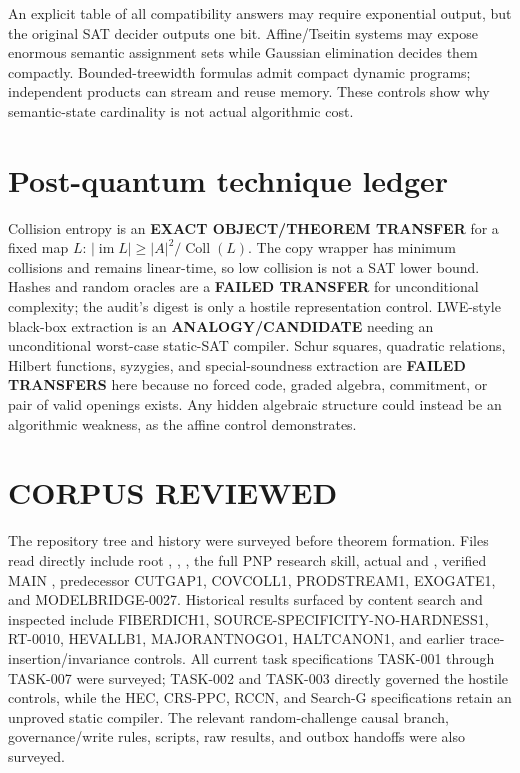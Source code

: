 \documentclass[11pt]{article}
\begin{document}
An explicit table of all compatibility answers may require exponential
output, but the original SAT decider outputs one bit.  Affine/Tseitin systems
may expose enormous semantic assignment sets while Gaussian elimination
decides them compactly.  Bounded-treewidth formulas admit compact dynamic
programs; independent products can stream and reuse memory.  These controls
show why semantic-state cardinality is not actual algorithmic cost.

\section{Post-quantum technique ledger}
Collision entropy is an \textbf{EXACT OBJECT/THEOREM TRANSFER} for a fixed
map $L$: $|\operatorname{im}L|\ge |A|^2/\operatorname{Coll}(L)$.  The copy
wrapper has minimum collisions and remains linear-time, so low collision is
not a SAT lower bound.  Hashes and random oracles are a \textbf{FAILED
TRANSFER} for unconditional complexity; the audit's digest is only a hostile
representation control.  LWE-style black-box extraction is an
\textbf{ANALOGY/CANDIDATE} needing an unconditional worst-case static-SAT
compiler.  Schur squares, quadratic relations, Hilbert functions, syzygies,
and special-soundness extraction are \textbf{FAILED TRANSFERS} here because
no forced code, graded algebra, commitment, or pair of valid openings exists.
Any hidden algebraic structure could instead be an algorithmic weakness, as
the affine control demonstrates.

\section{CORPUS REVIEWED}
The repository tree and history were surveyed before theorem formation.
Files read directly include root , ,
, the full PNP research skill, actual  and
, verified MAIN ,
predecessor CUTGAP1, COVCOLL1, PRODSTREAM1, EXOGATE1, and MODELBRIDGE-0027.
Historical results surfaced by content search and inspected include
FIBERDICH1, SOURCE-SPECIFICITY-NO-HARDNESS1, RT-0010, HEVALLB1,
MAJORANTNOGO1, HALTCANON1, and earlier trace-insertion/invariance controls.
All current task specifications TASK-001 through TASK-007 were surveyed;
TASK-002 and TASK-003 directly governed the hostile controls, while the HEC,
CRS-PPC, RCCN, and Search-G specifications retain an unproved static compiler.
The relevant random-challenge causal branch, governance/write rules, scripts,
raw results, and outbox handoffs were also surveyed.
\end{document}
